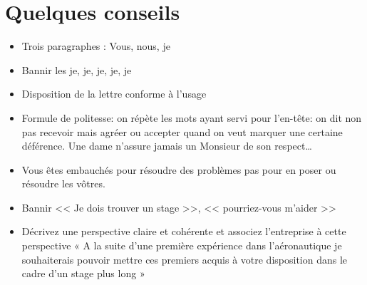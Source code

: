 \documentclass[12pt,a4paper,openany]{book}
\begin{document}
	\section{Quelques conseils}
	\begin{itemize}
		\item Trois paragraphes : Vous, nous, je
		\item Bannir les je, je, je, je, je
		\item Disposition de la lettre conforme à l’usage
		\item Formule de politesse: on répète les mots ayant servi pour l'en-tête: on dit non pas recevoir mais agréer ou accepter quand on veut marquer une certaine
	déférence. Une dame n’assure jamais un Monsieur de son respect\ldots
	\item Vous êtes embauchés pour résoudre des problèmes pas pour en poser ou résoudre les vôtres.
	\item Bannir << Je dois trouver un stage >>, << pourriez-vous m'aider >>
	\item Décrivez une perspective claire et cohérente et associez l’entreprise à cette perspective « A la suite d’une première expérience dans l’aéronautique je
	souhaiterais pouvoir mettre ces premiers acquis à votre disposition dans le cadre d’un stage plus long »
	\end{itemize}
\end{document}
